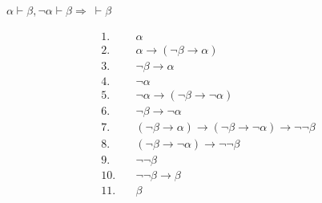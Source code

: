 \begin{exercise}[6]
    \(\alpha \vdash \beta, \neg \alpha \vdash \beta \Rightarrow\ \vdash \beta\)

    \begin{align*}
        1.\quad  & \alpha \tag{\(\in\Gamma\)}                                                              \\
        2.\quad  & \alpha \to (\neg \beta \to \alpha) \tag{a. 1}                                           \\
        3.\quad  & \neg \beta \to \alpha \tag{M.P. 1,2}                                                    \\
        4.\quad  & \neg \alpha \tag{\(\in\Gamma\)}                                                         \\
        5.\quad  & \neg \alpha \to (\neg \beta \to \neg \alpha) \tag{a. 1}                                 \\
        6.\quad  & \neg \beta \to \neg \alpha \tag{M.P. 4,5}                                               \\
        7.\quad  & (\neg \beta \to \alpha) \to (\neg \beta \to \neg \alpha) \to \neg \neg \beta \tag{a. 9} \\
        8.\quad  & (\neg \beta \to \neg \alpha) \to \neg \neg \beta \tag{M.P. 3,7}                         \\
        9.\quad  & \neg \neg \beta \tag{M.P. 6,8}                                                          \\
        10.\quad & \neg \neg \beta \to \beta \tag{a. 10}                                                   \\
        11.\quad & \beta \tag{M.P. 9,10}                                                                   \\
    \end{align*}
\end{exercise}

